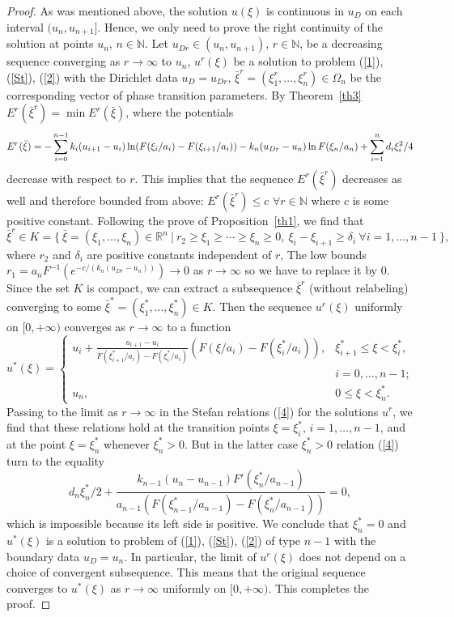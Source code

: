 \documentclass[12pt]{article}
\theoremstyle{plain}
\theoremstyle{definition}
\numberwithin{equation}{section}
\newcommand{\R}{{\mathbb R}}
\newcommand{\N}{{\mathbb N}}
\begin{document}
\begin{proof}
As was mentioned above, the solution $u(\xi)$ is continuous in $u_D$ on each interval $(u_n,u_{n+1}]$. Hence, we only need to prove the right continuity of the solution at points $u_n$, $n\in\N$. Let $u_{Dr}\in (u_n,u_{n+1})$, $r\in\N$, be a decreasing sequence converging as $r\to\infty$ to $u_n$, $u^r(\xi)$ be a solution to problem (\ref{1}), (\ref{St}), (\ref{2}) with the Dirichlet data $u_D=u_{Dr}$, $\bar\xi^r=(\xi^r_1,\ldots,\xi^r_n)\in\Omega_n$ be the corresponding vector of phase transition parameters. By Theorem~\ref{th3} $E^r(\bar\xi^r)=\min E^r(\bar\xi)$, where the potentials
\[E^r(\bar\xi)=-\sum_{i=0}^{n-1} k_i(u_{i+1}-u_i)\ln (F(\xi_i/a_i)-F(\xi_{i+1}/a_i))-\nonumber\\  k_n(u_{Dr}-u_n)\ln F(\xi_n/a_n)+\sum_{i=1}^n d_i\xi_i^2/4\] decrease with respect to $r$. This implies that the sequence $E^r(\bar\xi^r)$ decreases as well and therefore bounded from above: $E^r(\bar\xi^r)\le c$ $\forall r\in\N$ where $c$ is some positive constant. Following the prove of Proposition~\ref{th1}, we find that
\[\bar\xi^r\in K=\{ \ \bar\xi=(\xi_1,\ldots,\xi_n)\in\R^n \ | \ r_2\ge\xi_1\ge\cdots\ge\xi_n\ge 0, \ \xi_i-\xi_{i+1}\ge\delta_i \ \forall i=1,\ldots,n-1 \ \},
\]
where $r_2$ and $\delta_i$ are positive constants independent of $r$, The low bounds $r_1=a_nF^{-1}(e^{-c/(k_n(u_{Dr}-u_n))})\to 0$ as $r\to\infty$ so we have to replace it by $0$. Since the set $K$ is compact, we can extract a subsequence $\bar\xi^r$ (without relabeling) converging to some $\bar\xi^*=(\xi^*_1,\ldots,\xi^*_n)\in K$.
Then the sequence $u^r(\xi)$ uniformly on $[0,+\infty)$ converges as $r\to\infty$ to a function
\[
u^*(\xi)=\left\{\begin{array}{lr} u_i+\frac{u_{i+1}-u_i}{F(\xi^*_{i+1}/a_i)-F(\xi^*_i/a_i)}(F(\xi/a_i)-F(\xi^*_i/a_i)), &
\xi^*_{i+1}\le\xi<\xi^*_i, \\ & i=0,\ldots,n-1; \\
u_n, & 0\le\xi<\xi^*_n.
\end{array}\right.
\]
Passing to the limit as $r\to\infty$ in the Stefan relations (\ref{4}) for the solutions $u^r$, we find that these relations hold at the transition points $\xi=\xi^*_i$, $i=1,\ldots,n-1$, and at the point $\xi=\xi^*_n$ whenever
$\xi^*_n>0$. But in the latter case $\xi^*_n>0$ relation (\ref{4}) turn to the equality
\[
d_n\xi^*_n/2+
\frac{k_{n-1}(u_n-u_{n-1})F'(\xi^*_n/a_{n-1})}{a_{n-1}(F(\xi^*_{n-1}/a_{n-1})-F(\xi^*_n/a_{n-1}))}=0,
\]
which is impossible because its left side is positive. We conclude that $\xi^*_n=0$ and $u^*(\xi)$ is a solution
to problem of (\ref{1}), (\ref{St}), (\ref{2}) of type $n-1$ with the boundary data $u_D=u_n$. In particular, the limit of
$u^r(\xi)$ does not depend on a choice of convergent subsequence. This means that the original sequence converges to $u^*(\xi)$ as $r\to\infty$ uniformly on $[0,+\infty)$. This completes the proof.
\end{proof}
\end{document}
